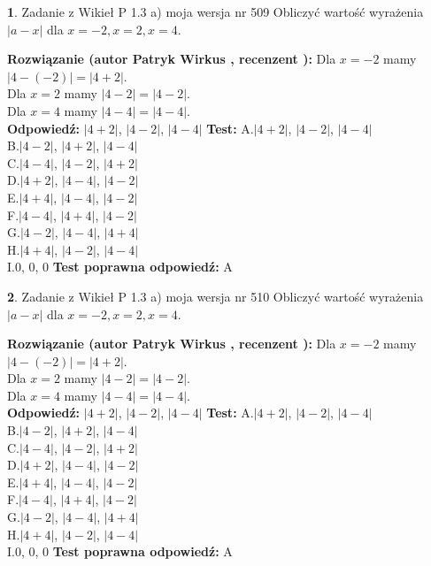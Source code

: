 \documentclass[12pt, a4paper]{article}
\theoremstyle{definition} %
\newtheorem{zad}{}
\newcommand{\zadStart}[1]{\begin{zad}#1\newline}
\newcommand{\zadStop}{\end{zad}}
\newcommand{\rozwStart}[2]{\noindent \textbf{Rozwiązanie (autor #1 , recenzent #2): }\newline}
\newcommand{\rozwStop}{\newline}
\newcommand{\odpStart}{\noindent \textbf{Odpowiedź:}\newline}
\newcommand{\odpStop}{\newline}
\newcommand{\testStart}{\noindent \textbf{Test:}\newline}
\newcommand{\testStop}{\newline}
\newcommand{\kluczStart}{\noindent \textbf{Test poprawna odpowiedź:}\newline}
\newcommand{\kluczStop}{\newline}
\begin{document}
\zadStart{Zadanie z Wikieł P 1.3 a) moja wersja nr 509}
Obliczyć wartość wyrażenia $|a - x|$ dla $x=-2,x=2,x=4$.
\zadStop
\rozwStart{Patryk Wirkus}{}
Dla $x = -2$ mamy $|4 - (-2)| = |4 + 2|$.\\
Dla $x = 2$ mamy $|4 - 2| = |4 - 2|$.\\
Dla $x = 4$ mamy $|4 - 4| = |4 - 4|$.\\
\rozwStop
\odpStart
$|4 + 2|$, $|4 - 2|$, $|4 - 4|$
\odpStop
\testStart
A.$|4 + 2|$, $|4 - 2|$, $|4 - 4|$\\
B.$|4 - 2|$, $|4 + 2|$, $|4 - 4|$\\
C.$|4 - 4|$, $|4 - 2|$, $|4 + 2|$\\
D.$|4 + 2|$, $|4 - 4|$, $|4 - 2|$\\
E.$|4 + 4|$, $|4 - 4|$, $|4 - 2|$\\
F.$|4 - 4|$, $|4 + 4|$, $|4 - 2|$\\
G.$|4 - 2|$, $|4 - 4|$, $|4 + 4|$\\
H.$|4 + 4|$, $|4 - 2|$, $|4 - 4|$\\
I.$0$, $0$, $0$
\testStop
\kluczStart
A
\kluczStop



\zadStart{Zadanie z Wikieł P 1.3 a) moja wersja nr 510}
Obliczyć wartość wyrażenia $|a - x|$ dla $x=-2,x=2,x=4$.
\zadStop
\rozwStart{Patryk Wirkus}{}
Dla $x = -2$ mamy $|4 - (-2)| = |4 + 2|$.\\
Dla $x = 2$ mamy $|4 - 2| = |4 - 2|$.\\
Dla $x = 4$ mamy $|4 - 4| = |4 - 4|$.\\
\rozwStop
\odpStart
$|4 + 2|$, $|4 - 2|$, $|4 - 4|$
\odpStop
\testStart
A.$|4 + 2|$, $|4 - 2|$, $|4 - 4|$\\
B.$|4 - 2|$, $|4 + 2|$, $|4 - 4|$\\
C.$|4 - 4|$, $|4 - 2|$, $|4 + 2|$\\
D.$|4 + 2|$, $|4 - 4|$, $|4 - 2|$\\
E.$|4 + 4|$, $|4 - 4|$, $|4 - 2|$\\
F.$|4 - 4|$, $|4 + 4|$, $|4 - 2|$\\
G.$|4 - 2|$, $|4 - 4|$, $|4 + 4|$\\
H.$|4 + 4|$, $|4 - 2|$, $|4 - 4|$\\
I.$0$, $0$, $0$
\testStop
\kluczStart
A
\kluczStop
\end{document}
